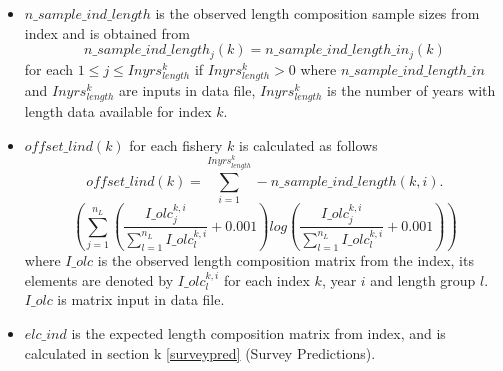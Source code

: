\documentclass{article}
\begin{document}
\begin{itemize}
    \item $n\_sample\_ind\_length$ is the observed length composition sample sizes from index
 and is obtained from $$n\_sample\_ind\_length_j(k) = n\_sample\_ind\_length\_in_j(k)$$ for each $1\leq j \leq Inyrs^k_{length}$ if $Inyrs^k_{length}>0$ 
 where $n\_sample\_ind\_length\_in$ and $Inyrs^k_{length}$ are inputs  %
 in data file, $Inyrs^k_{length}$ is the number of years with length data available for
index $k$. %
 
\item $offset\_lind(k)$ for each fishery $k$ is calculated as follows
\begin{equation*}
    offset\_lind(k)=\displaystyle\sum_{i=1}^{Inyrs^k_{length}}-n\_sample\_ind\_length(k,i).
\end{equation*}
\begin{equation*}
   \left(\sum_{j=1}^{n_L}\left(\dfrac{I\_olc^{k,i}_j}{\sum_{l=1}^{n_L} I\_olc^{k,i}_l}+0.001\right)log\left(\dfrac{I\_olc^{k,i}_j}{\sum_{l=1}^{n_L} I\_olc^{k,i}_l}+0.001\right)\right)
\end{equation*}
where $I\_olc$ is the observed length composition matrix from the index, %
its elements are denoted by $I\_olc^{k,i}_l$ for each index $k$, year $i$ and length group $l$. %
$I\_olc$ is matrix input in data file.
\item $elc\_ind$ is the expected length composition matrix from index, and is calculated in section k \ref{surveypred} (Survey Predictions).
\end{itemize}
\end{document}
